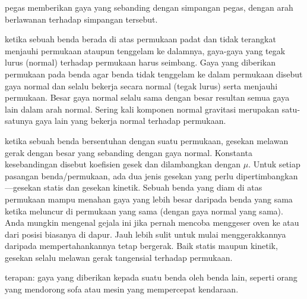 \begin{description}
pegas memberikan gaya yang sebanding dengan simpangan pegas, dengan
arah berlawanan terhadap simpangan tersebut.
\item [{Normal:}] ketika
sebuah benda berada di atas permukaan padat dan tidak terangkat menjauhi
permukaan ataupun tenggelam ke dalamnya, gaya-gaya yang tegak lurus
(normal) terhadap permukaan harus seimbang. Gaya yang diberikan permukaan
pada benda agar benda tidak tenggelam ke dalam permukaan disebut gaya
normal dan selalu bekerja secara normal (tegak lurus) serta menjauhi
permukaan. Besar gaya normal selalu sama dengan besar resultan semua
gaya lain dalam arah normal. Sering kali komponen normal gravitasi
merupakan satu-satunya gaya lain yang bekerja normal terhadap permukaan.
\item [{Gesekan:}] ketika
sebuah benda bersentuhan dengan suatu permukaan, gesekan melawan gerak
dengan besar yang sebanding dengan gaya normal. Konstanta kesebandingan
disebut koefisien gesek dan dilambangkan dengan $\mu$. Untuk setiap
pasangan benda/permukaan, ada dua jenis gesekan yang perlu dipertimbangkan---gesekan
statis dan gesekan kinetik. Sebuah benda yang diam di atas permukaan
mampu menahan gaya yang lebih besar daripada benda yang sama ketika
meluncur di permukaan yang sama (dengan gaya normal yang sama). Anda
mungkin mengenal gejala ini jika pernah mencoba menggeser oven ke
atau dari posisi biasanya di dapur. Jauh lebih sulit untuk mulai menggerakkannya
daripada mempertahankannya tetap bergerak. Baik statis maupun kinetik,
gesekan selalu melawan gerak tangensial terhadap permukaan.
\item [{Gaya}] terapan: gaya
yang diberikan kepada suatu benda oleh benda lain, seperti orang yang
mendorong sofa atau mesin yang mempercepat kendaraan.
\end{description}
